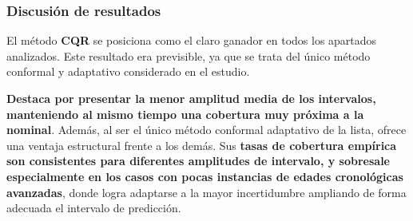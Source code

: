 

    



\subsubsection{Discusión de resultados}

El método \textbf{\acrshort{CQR}} se posiciona como el claro ganador en todos los apartados analizados. Este resultado era previsible, ya que se trata del único método conformal y adaptativo considerado en el estudio.

\textbf{Destaca por presentar la menor amplitud media de los intervalos, manteniendo al mismo tiempo una cobertura muy próxima a la nominal}. Además, al ser el único método conformal adaptativo de la lista, ofrece una ventaja estructural frente a los demás. Sus \textbf{tasas de cobertura empírica son consistentes para diferentes amplitudes de intervalo, y sobresale especialmente en los casos con pocas instancias de edades cronológicas avanzadas}, donde logra adaptarse a la mayor incertidumbre ampliando de forma adecuada el intervalo de predicción.



